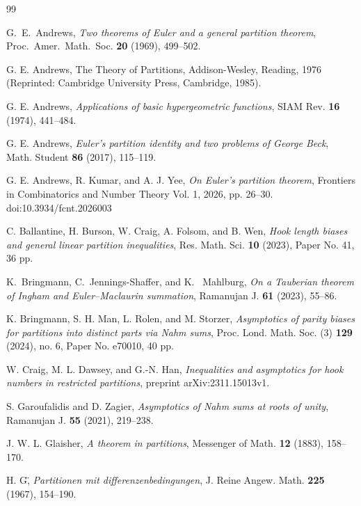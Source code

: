 \documentclass[11pt,reqno]{amsart}
\theoremstyle{remark}
\numberwithin{equation}{section}
\begin{document}
\begin{thebibliography}{99}

G.~E.~Andrews, {\it Two theorems of Euler and a general partition theorem}, Proc.~Amer.~Math.~Soc. {\bf 20} (1969), 499--502.

G. E. Andrews, The Theory of Partitions, Addison-Wesley, Reading, 1976 (Reprinted: Cambridge University Press, Cambridge, 1985).

G. E. Andrews, {\it Applications of basic hypergeometric functions}, SIAM Rev. {\bf 16} (1974), 441--484. 

G. E. Andrews, {\it Euler's partition identity and two problems of George Beck},  Math. Student {\bf 86} (2017), 115--119. 

G. E. Andrews, R. Kumar, and A. J. Yee, {\it On Euler's partition theorem}, Frontiers in Combinatorics and Number Theory
Vol. 1, 2026, pp. 26--30. doi:10.3934/fcnt.2026003

C. Ballantine, H. Burson, W. Craig, A. Folsom, and B. Wen, {\it Hook length biases and general linear partition inequalities}, Res. Math. Sci. {\bf 10} (2023), Paper No. 41, 36 pp.

K.~Bringmann, C.~Jennings-Shaffer, and K.~ Mahlburg, {\it On a Tauberian theorem of Ingham and Euler--Maclaurin summation}, Ramanujan J. {\bf 61} (2023), 55--86.

K. Bringmann,  S. H. Man, L. Rolen,  and M. Storzer, {\it Asymptotics of parity biases for partitions into distinct parts via Nahm sums}, Proc. Lond. Math. Soc. (3) {\bf 129} (2024), no. 6, Paper No. e70010, 40 pp.

W. Craig, M. L. Dawsey, and G.-N. Han, {\it Inequalities and asymptotics for hook numbers in restricted partitions}, preprint arXiv:2311.15013v1. 


S. Garoufalidis and D. Zagier, {\it Asymptotics of Nahm sums at roots of unity}, Ramanujan J. {\bf 55} (2021), 219--238. 

J. W. L. Glaisher, {\it A theorem in partitions}, Messenger of Math. {\bf 12} (1883), 158--170.

H. G\"    , {\it Partitionen mit differenzenbedingungen}, J. Reine Angew. Math. {\bf 225} (1967), 154--190.


\end{thebibliography}
\end{document}
